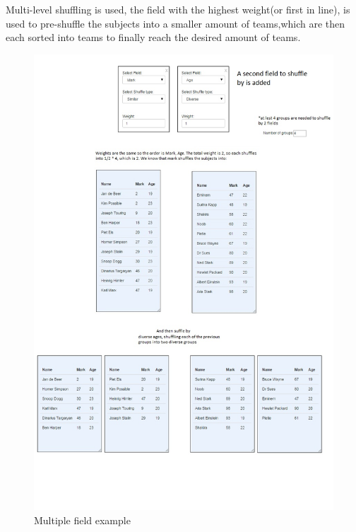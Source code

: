 \begin{enumerate}
Multi-level shuffling is used, the field with the highest weight(or first in line),
is used to pre-shuffle the subjects into a smaller amount of teams,which are then each sorted into teams to finally reach the desired amount of teams.
  \par
 \begin{figure}[H] 
	\centering
	\includegraphics[width=16cm]{./graphics/multipleField.jpg}\par
	\caption{Multiple field example}
\end{figure}



\end{enumerate}


